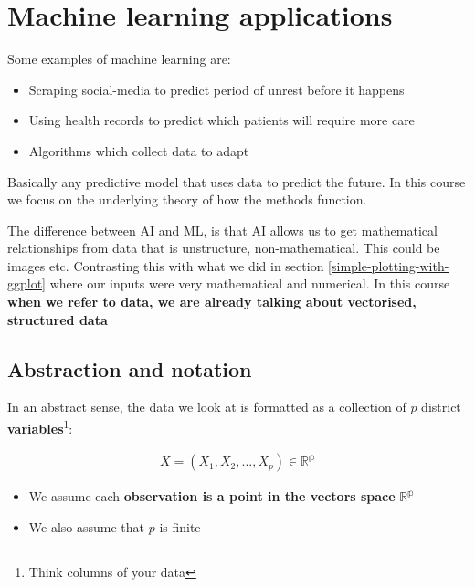 \documentclass[
]{report}
\providecommand{\tightlist}{%
  \setlength{\itemsep}{0pt}\setlength{\parskip}{0pt}}
\renewenvironment{quote}{
	\bigskip\begin{mdframed}[
			skipabove=\topskip,
			skipbelow=\topskip,
			backgroundcolor=quoteshadecolor,
			leftmargin=0.5cm,
			rightmargin=0.5cm,
			topline=false,
			rightline=false,
			bottomline=false,
			nobreak=true,
		]\itshape%
		}{
	\end{mdframed}
}
\theoremstyle{definition}
\theoremstyle{definition}
\theoremstyle{definition}
\theoremstyle{definition}
\theoremstyle{remark}
\begin{document}
\hypertarget{machine-learning-applications}{%
\chapter{Machine learning applications}\label{machine-learning-applications}}

Some examples of machine learning are:

\begin{itemize}
\tightlist
\item
  Scraping social-media to predict period of unrest before it happens
\item
  Using health records to predict which patients will require more care
\item
  Algorithms which collect data to adapt
\end{itemize}

Basically any predictive model that uses data to predict the future. In this
course we focus on the underlying theory of how the methods function.

\begin{quote}
The difference between AI and ML, is that AI allows us to get mathematical
relationships from data that is unstructure, non-mathematical. This could be
images etc. Contrasting this with what we did in section
\ref{simple-plotting-with-ggplot} where our inputs were very mathematical
and numerical. In this course \textbf{when we refer to data, we are already talking
about vectorised, structured data}
\end{quote}

\hypertarget{abstraction-and-notation}{%
\section{Abstraction and notation}\label{abstraction-and-notation}}

In an abstract sense, the data we look at is formatted as a collection of \(p\)
district \textbf{variables}\footnote{Think columns of your data}:

\begin{align*}
  X = (X_1, X_2, \ldots, X_p) \in \mathbb{R^{p}}
\end{align*}

\begin{itemize}
\tightlist
\item
  We assume each \textbf{observation is a point in the vectors space}
  \(\mathbb{R^{p}}\)
\item
  We also assume that \(p\) is finite
\end{itemize}
\end{document}
